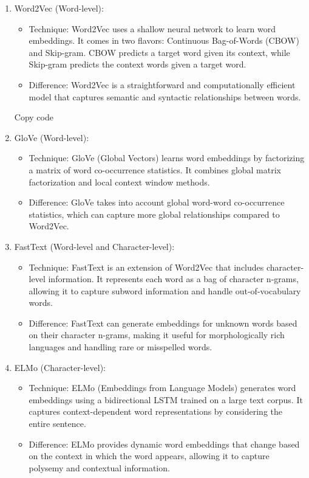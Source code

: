 \begin{enumerate}
\item Word2Vec (Word-level):
\begin{itemize}
\item Technique: Word2Vec uses a shallow neural network to learn word embeddings. It comes in two flavors: Continuous Bag-of-Words (CBOW) and Skip-gram. CBOW predicts a target word given its context, while Skip-gram predicts the context words given a target word.
\item Difference: Word2Vec is a straightforward and computationally efficient model that captures semantic and syntactic relationships between words.
\end{itemize}


Copy code
\item GloVe (Word-level):
\begin{itemize}
    \item Technique: GloVe (Global Vectors) learns word embeddings by factorizing a matrix of word co-occurrence statistics. It combines global matrix factorization and local context window methods.
    \item Difference: GloVe takes into account global word-word co-occurrence statistics, which can capture more global relationships compared to Word2Vec.
\end{itemize}

\item FastText (Word-level and Character-level):
\begin{itemize}
    \item Technique: FastText is an extension of Word2Vec that includes character-level information. It represents each word as a bag of character n-grams, allowing it to capture subword information and handle out-of-vocabulary words.
    \item Difference: FastText can generate embeddings for unknown words based on their character n-grams, making it useful for morphologically rich languages and handling rare or misspelled words.
\end{itemize}

\item ELMo (Character-level):
\begin{itemize}
    \item Technique: ELMo (Embeddings from Language Models) generates word embeddings using a bidirectional LSTM trained on a large text corpus. It captures context-dependent word representations by considering the entire sentence.
    \item Difference: ELMo provides dynamic word embeddings that change based on the context in which the word appears, allowing it to capture polysemy and contextual information.
\end{itemize}


\end{enumerate}
